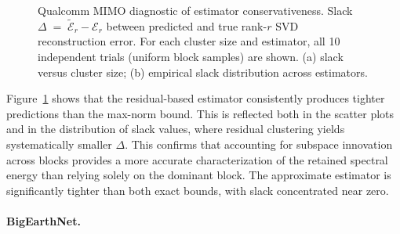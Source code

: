 \documentclass[10pt]{article} %
\begin{document}
\begin{figure}[tb]
\caption{Qualcomm MIMO diagnostic of estimator conservativeness. Slack
$\Delta \;=\;\widetilde{\mathcal{E}}_r - \mathcal{E}_r$ between predicted and true
rank-$r$ SVD reconstruction error. For each cluster size and estimator, all 10
independent trials (uniform block samples) are shown. (a) slack versus cluster size;
(b) empirical slack distribution across estimators.}
\label{fig:error-estimates-qualcomm}
\end{figure}

Figure~\ref{fig:error-estimates-qualcomm} shows that the residual-based estimator consistently produces tighter predictions than the max-norm bound.
This is reflected both in the scatter plots and in the distribution of slack values, where residual clustering yields systematically smaller $\Delta$.
This confirms that accounting for subspace innovation across blocks provides a more accurate characterization of the retained spectral energy than relying solely on the dominant block.
The approximate estimator is significantly tighter than both exact bounds, with slack concentrated near zero.

\paragraph{BigEarthNet.}
\end{document}
